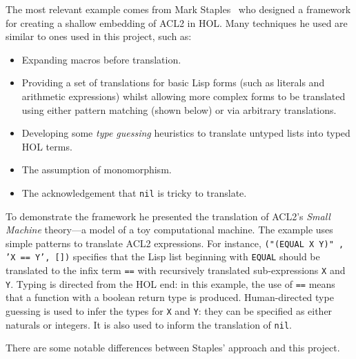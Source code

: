 \documentclass[a4paper,12pt,twoside,openright]{report}
\begin{document}
The most relevant example comes from Mark Staples~\cite{staples} who designed a framework for creating a shallow embedding of ACL2 in HOL.  Many techniques he used are similar to ones used in this project, such as:

\begin{itemize}
  \item Expanding macros before translation.
  \item Providing a set of translations for basic Lisp forms (such as literals and arithmetic expressions) whilst allowing more complex forms to be translated using either pattern matching (shown below) or via arbitrary translations.
  \item Developing some \emph{type guessing} heuristics to translate untyped lists into typed HOL terms.
  \item The assumption of monomorphism.
  \item The acknowledgement that \texttt{nil} is tricky to translate.
\end{itemize}

To demonstrate the framework he presented the translation of ACL2's \emph{Small Machine} theory---a model of a toy computational machine.  The example uses simple patterns to translate ACL2 expressions.  For instance, \texttt{("(EQUAL X Y)" , 'X == Y', [])} specifies that the Lisp list beginning with \texttt{EQUAL} should be translated to the infix term \texttt{==} with recursively translated sub-expressions \texttt{X} and \texttt{Y}.  Typing is directed from the HOL end: in this example, the use of \texttt{==} means that a function with a boolean return type is produced.  Human-directed type guessing is used to infer the types for \texttt{X} and \texttt{Y}: they can be specified as either naturals or integers.  It is also used to inform the translation of \texttt{nil}.

There are some notable differences between Staples' approach and this project.
\end{document}

